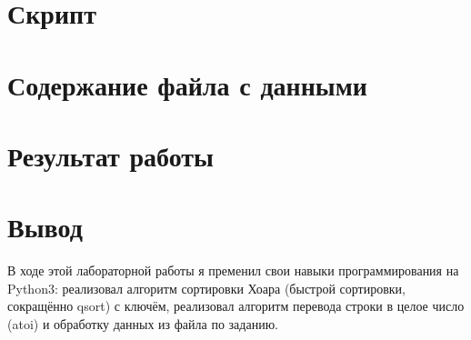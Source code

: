 \documentclass[11pt]{article}
\begin{document}
\section{Скрипт}
\footnotesize
{}
\pagebreak{}
\small
\section{Содержание файла с данными}

\section{Результат работы}

\large
\section{Вывод}
В ходе этой лабораторной работы я пременил свои навыки программирования на Python3: реализовал алгоритм сортировки Хоара (быстрой сортировки, сокращённо qsort) с ключём, реализовал алгоритм перевода строки в целое
число (atoi) и обработку данных из файла по заданию.
\end{document}
